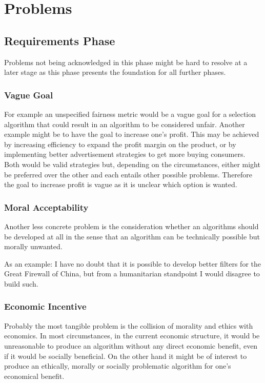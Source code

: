 \section{Problems}

\subsection{Requirements Phase}
Problems not being acknowledged in this phase might be hard to resolve at a later stage as this phase presents the foundation for all further phases. 

\subsubsection{Vague Goal}
For example an unspecified fairness metric would be a vague goal for a selection algorithm that could result in an algorithm to be considered unfair.
Another example might be to have the goal to increase one's profit. This may be achieved by increasing efficiency to expand the profit margin on the product, or by implementing better advertisement strategies to get more buying consumers. Both would be valid strategies but, depending on the circumstances, either might be preferred over the other and each entails other possible problems. Therefore the goal to increase profit is vague as it is unclear which option is wanted.  

\subsubsection{Moral Acceptability}

Another less concrete problem is the consideration whether an algorithms should be developed at all in the sense that an algorithm can be technically possible but morally unwanted.

As an example:
I have no doubt that it is possible to develop better filters for the Great Firewall of China, but from a humanitarian standpoint I would disagree to build such.

\subsubsection{Economic Incentive}

Probably the most tangible problem is the collision of morality and ethics with economics. 
In most circumstances, in  the current economic structure, it would be unreasonable to produce an algorithm without any direct economic benefit, even if it would be socially beneficial. 
On the other hand it might be of interest to produce an ethically, morally or socially problematic algorithm for one's economical benefit. 

